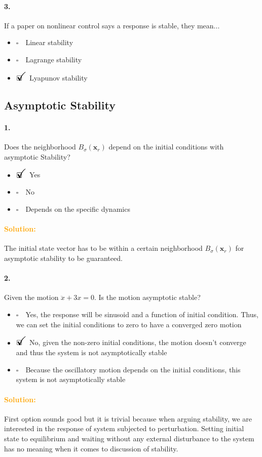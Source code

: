 \documentclass[12pt, a4paper]{article}
\newcommand{\ans}{\item[]$\rlap{\LARGE{\checkmark}}\square\quad$}
\newcommand{\noans}{\item[]$\square\quad$}
\begin{document}
\paragraph{3.}
If a paper on nonlinear control says a response is stable, they mean...

\begin{itemize}
\noans Linear stability
\noans Lagrange stability
\ans Lyapunov stability
\end{itemize}

\newpage
\subsection{Asymptotic Stability}
\paragraph{1.}
Does the neighborhood $B_{\sigma}(\bm{x}_{r})$ depend on the initial conditions with asymptotic Stability?

\begin{itemize}
\ans Yes
\noans No
\noans Depends on the specific dynamics
\end{itemize}

\paragraph{\textcolor{orange}{Solution:}}
The initial state vector has to be within a certain neighborhood $B_{\sigma}(\bm{x}_{r})$ for asymptotic stability to be guaranteed.

\paragraph{2.} Given the motion $\ddot{x} + 3 x = 0$. Is the motion asymptotic stable?

\begin{itemize}
\noans Yes, the response will be sinusoid and a function of initial condition. Thus, we can set the initial conditions to zero to have a converged zero motion
\ans No, given the non-zero initial conditions, the motion doesn't converge and thus the system is not asymptotically stable
\noans Because the oscillatory motion depends on the initial conditions, this system is not asymptotically stable
\end{itemize}

\paragraph{\textcolor{orange}{Solution:}}
First option sounds good but it is trivial because when arguing stability, we are interested in the response of system subjected to perturbation. Setting initial state to equilibrium and waiting without any external disturbance to the system has no meaning when it comes to discussion of stability.
\end{document}
